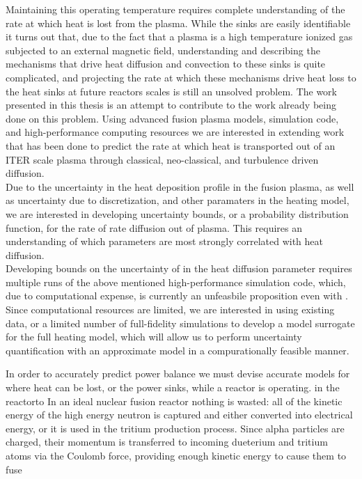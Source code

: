 \documentclass{article}
\begin{document}
Maintaining this operating temperature requires complete understanding of the rate at which heat is lost from the plasma. While the sinks are easily identifiable it turns out that, due to the fact that a plasma is a high temperature ionized gas subjected to an external magnetic field, understanding and describing the mechanisms that drive heat diffusion and convection to these sinks is quite complicated, and projecting the rate at which these mechanisms drive heat loss to the heat sinks at future reactors scales is still an unsolved problem. The work presented in this thesis is an attempt to contribute to the work already being done on this problem. Using advanced fusion plasma models, simulation code, and high-performance computing resources we are interested in extending work that has been done to predict the rate at which heat is transported out of an ITER scale plasma through classical, neo-classical, and turbulence driven diffusion.\\
Due to the uncertainty in the heat deposition profile in the fusion plasma, as well as uncertainty due to discretization, and other paramaters in the heating model, we are interested in developing uncertainty bounds, or a probability distribution function, for the rate of rate diffusion out of plasma. This requires an understanding of which parameters are most strongly correlated with heat diffusion.\\
Developing bounds on the uncertainty of in the heat diffusion parameter requires multiple runs of the above mentioned high-performance simulation code, which, due to computational expense, is currently an unfeasbile proposition even with . Since computational resources are limited, we are interested in using existing data, or a limited number of full-fidelity simulations to develop a model surrogate for the full heating model, which will allow us to perform uncertainty quantification with an approximate model in a compurationally feasible manner.


In order to accurately predict power balance we must devise accurate models for where heat can be lost, or the power sinks, while a reactor is operating. in the reactorto In an ideal nuclear fusion reactor nothing is wasted: all of the kinetic energy of the high energy neutron is captured and either converted into electrical energy, or it is used in the tritium production process. Since alpha particles are charged, their momentum is transferred to incoming dueterium and tritium atoms via the Coulomb force, providing enough kinetic energy to cause them to fuse
\end{document}
